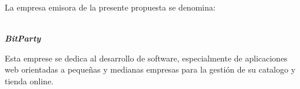 La empresa emisora de la presente propuesta se denomina:
\begin{center}
        \textbf{\textit{\large \\ BitParty}}
\end{center}
Esta emprese se dedica al desarrollo de software, especialmente de aplicaciones web orientadas a pequeñas y medianas empresas para la gestión de su catalogo y tienda online.
\newpage
